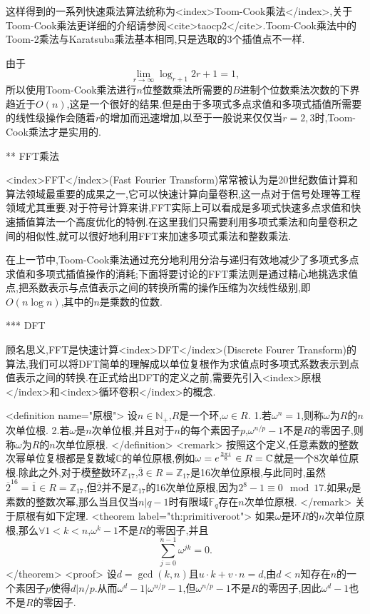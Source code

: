这样得到的一系列快速乘法算法统称为<index>Toom-Cook乘法</index>,关于Toom-Cook乘法更详细的介绍请参阅<cite>taocp2</cite>.Toom-Cook乘法中的Toom-2乘法与Karatsuba乘法基本相同,只是选取的3个插值点不一样.

由于$$\lim_{r\rightarrow\infty}\log_{r+1}{2r+1}=1,$$所以使用Toom-Cook乘法进行$n$位整数乘法所需要的$B$进制个位数乘法次数的下界趋近于$O(n)$,这是一个很好的结果.但是由于多项式多点求值和多项式插值所需要的线性级操作会随着$r$的增加而迅速增加,以至于一般说来仅仅当$r=2,3$时,Toom-Cook乘法才是实用的.

** FFT乘法

<index>FFT</index>(Fast Fourier Transform)常常被认为是20世纪数值计算和算法领域最重要的成果之一,它可以快速计算向量卷积,这一点对于信号处理等工程领域尤其重要.对于符号计算来讲,FFT实际上可以看成是多项式快速多点求值和快速插值算法一个高度优化的特例.在这里我们只需要利用多项式乘法和向量卷积之间的相似性,就可以很好地利用FFT来加速多项式乘法和整数乘法.

在上一节中,Toom-Cook乘法通过充分地利用分治与递归有效地减少了多项式多点求值和多项式插值操作的消耗;下面将要讨论的FFT乘法则是通过精心地挑选求值点,把系数表示与点值表示之间的转换所需的操作压缩为次线性级别,即$O(n\log{n})$,其中的$n$是乘数的位数.

*** DFT

顾名思义,FFT是快速计算<index>DFT</index>(Discrete Fourer Transform)的算法,我们可以将DFT简单的理解成以单位复根作为求值点时多项式系数表示到点值表示之间的转换.在正式给出DFT的定义之前,需要先引入<index>原根</index>和<index>循环卷积</index>的概念.

<definition  name="原根">
设$n\in\mathbb{N}_+$,$R$是一个环,$\omega\in R$.
 1.若$\omega^n=1$,则称$\omega$为$R$的$n$次单位根.
 2.若$\omega$是$n$次单位根,并且对于$n$的每个素因子$p$,$\omega^{n/p}-1$不是$R$的零因子,则称$\omega$为$R$的$n$次单位原根.
</definition>
<remark>
按照这个定义,任意素数的整数次幂单位复根都是复数域$\mathbb{C}$的单位原根,例如$\omega=e^{{2\pi i\over 8}}\in R=\mathbb{C}$就是一个8次单位原根.除此之外,对于模整数环$\mathbb{Z}_{17}$,$\overline{3}\in R=\mathbb{Z}_{17}$是16次单位原根,与此同时,虽然$\overline{2}^{16}=\overline{1}\in R=\mathbb{Z}_{17}$,但$\overline{2}$并不是$\mathbb{Z}_{17}$的16次单位原根,因为$2^8-1\equiv 0\mod 17$.如果$q$是素数的整数次幂,那么当且仅当$n|q-1$时有限域$\mathbb{F}_q$存在$n$次单位原根.
</remark>
关于原根有如下定理.
<theorem label="th:primitiveroot">
如果$\omega$是环$R$的$n$次单位原根,那么$\forall 1<k<n$,$\omega^k-1$不是$R$的零因子,并且$$\sum_{j=0}^{n-1}\omega^{jk}=0.$$
</theorem>
<proof>
设$d=\gcd(k,n)$且$u\cdot k+v\cdot n=d$,由$d<n$知存在$n$的一个素因子$p$使得$d|n/p$.从而$\omega^d-1|\omega^{n/p}-1$,但$\omega^{n/p}-1$不是$R$的零因子,因此$\omega^d-1$也不是$R$的零因子.

